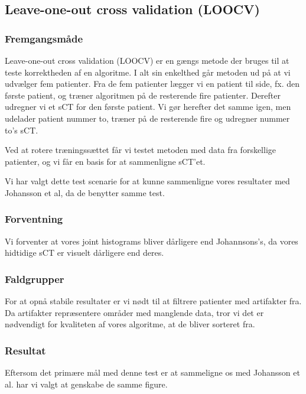 \subsection{Leave-one-out cross validation (LOOCV)}
\subsubsection{Fremgangsmåde}
Leave-one-out cross validation (LOOCV) er en gængs metode der bruges til at teste korrektheden af en algoritme. I alt sin enkelthed går metoden ud på at vi udvælger fem patienter. Fra de fem patienter lægger vi en patient til side, fx. den første patient, og træner algoritmen på de resterende fire patienter. Derefter udregner vi et sCT for den første patient. Vi gør herefter det samme igen, men udelader patient nummer to, træner på de resterende fire og udregner nummer to's sCT. 

Ved at rotere træningssættet får vi testet metoden med data fra forskellige patienter, og vi får en basis for at sammenligne sCT'et.

Vi har valgt dette test scenarie for at kunne sammenligne vores resultater med Johansson et al, da de benytter samme test.

\subsubsection{Forventning}
Vi forventer at vores joint histograms bliver dårligere end Johannsons's, da vores hidtidige sCT er visuelt dårligere end deres.


\subsubsection{Faldgrupper}
For at opnå stabile resultater er vi nødt til at filtrere patienter med artifakter fra. Da artifakter repræsentere områder med manglende data, tror vi det er nødvendigt for kvaliteten af vores algoritme, at de bliver sorteret fra.

\subsubsection{Resultat}

Eftersom det primære mål med denne test er at sammeligne os med Johansson et al. har vi valgt at genskabe de samme figure.

